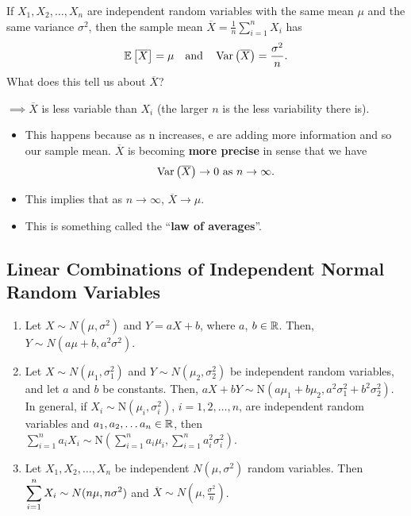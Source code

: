 \begin{remark}
    If $X_1,X_2,\ldots ,X_n$ are independent random variables with the same mean $\mu$ and the same variance $\sigma^2$, then the sample mean $\overline{X} = \frac{1}{n}\displaystyle \sum_{i=1}^{n} X_i$ has \vspace{-3mm}
    \[
        \mathbb{E}\left[{\overline{X}}\right] = \mu \quad \text{and} \quad \operatorname{Var}\left({\overline{X}}\right) = \frac{\sigma^2}{n}.
    \]
    What does this tell us about $\overline{X}$? 
    
    $\implies \overline{X}$ is less variable than $X_i$ (the larger $n$ is the less variability there is).
    \begin{itemize}
        \item This happens because as n increases, e are adding more
        information and so our sample mean. $\overline{X}$ is becoming \textbf{more precise} in sense that we have \vspace{-3mm}
        \[
            \operatorname{Var}\left({\overline{X}}\right) \to 0 \text{ as } n \to \infty.
        \]
        \item This implies that as $n\to \infty$, $\overline{X} \to \mu$.
        \item This is something called the ``\textbf{law of averages}''.
    \end{itemize}
\end{remark}

\pagebreak


\subsection{Linear Combinations of Independent Normal Random Variables}

\begin{theorem}
    \phantom{}
    \begin{enumerate}
        \item Let $X \sim N(\mu, \sigma^2)$ and $Y = aX + b$, where $a$, $b \in {\mathbb{R}}$.
        Then, $Y \sim N(a\mu + b, a^2\sigma^2)$.
        \item Let $X \sim N(\mu_1, \sigma_1^2)$ and $Y \sim N(\mu_2, \sigma_2^2)$ be independent random variables, and let $a$ and $b$ be constants.
        Then, $aX+bY \sim \text{N}(a\mu_1 + b\mu_2, a^2\sigma_1^2 + b^2\sigma_2^2)$. \\
        In general, if $X_i \sim \text{N}(\mu_i, \sigma_i^2)$, $i=1,2,\ldots,n$, are independent random variables and $a_1,a_2,\ldots a_n \in {\mathbb{R}}$, then $\displaystyle \sum_{i=1}^{n} a_iX_i \sim \text{N}\left( \displaystyle \sum_{i=1}^{n} a_i\mu_i, \displaystyle \sum_{i=1}^{n} a_i^2 \sigma_i^2 \right)$.
        \item Let $X_1, X_2, \ldots, X_n$ be independent $N(\mu, \sigma^2)$ random variables. Then
        $\displaystyle \sum_{i=1}^{n} X_i \sim N(n\mu, n\sigma^2)$ and $\overline{X} \sim N(\mu, \frac{\sigma^2}{n})$.
    \end{enumerate}
\end{theorem}

